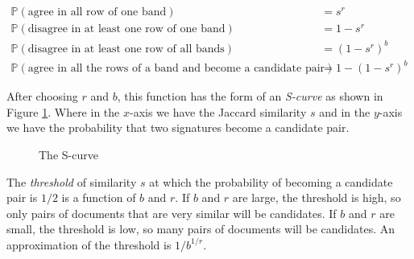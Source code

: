 \begin{equation*}
    \begin{split}
        \mathbb{P}(\text{agree in all row of one band}) & = s^r \\
        \mathbb{P}(\text{disagree in at least one row of one band}) & = 1 - s^r \\
        \mathbb{P}(\text{disagree in at least one row of all bands}) & = (1 - s^r)^b \\    
        \mathbb{P}(\text{agree in all the rows of a band and become a candidate pair}) & = 1 - (1 - s^r)^b
    \end{split}
\end{equation*}

After choosing $r$ and $b$, this function has the form of an \textit{S-curve} as shown in Figure \ref{fig:4-s-curve}. Where in the $x$-axis we have the Jaccard similarity $s$ and in the $y$-axis we have the probability that two signatures become a candidate pair. 

\begin{figure}[H]
\centering
\scalebox{1}{
    
}
\caption{The S-curve}
\label{fig:4-s-curve}
\end{figure}

The \textit{threshold} of similarity $s$ at which the probability of becoming a candidate pair is $1/2$ is a function of $b$ and $r$. If $b$ and $r$ are large, the threshold is high, so only pairs of documents that are very similar will be candidates. If $b$ and $r$ are small, the threshold is low, so many pairs of documents will be candidates. An approximation of the threshold is $1/b^{1/r}$.



